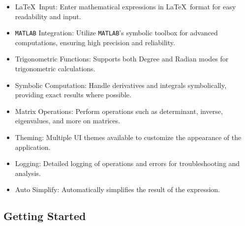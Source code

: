 \documentclass{article}
\begin{document}
\begin{itemize}
\item \LaTeX \, Input: Enter mathematical expressions in
  \LaTeX \, format for easy readability and input.
\item \texttt{MATLAB} Integration: Utilize \texttt{MATLAB}'s symbolic toolbox for
  advanced computations, ensuring high precision and reliability.
\item Trigonometric Functions: Supports both Degree and Radian
  modes for trigonometric calculations.
\item Symbolic Computation: Handle derivatives and integrals
  symbolically, providing exact results where possible.
\item Matrix Operations: Perform operations such as determinant,
  inverse, eigenvalues, and more on matrices.
\item Theming: Multiple UI themes available to customize the
  appearance of the application.
\item Logging: Detailed logging of operations and errors for
  troubleshooting and analysis.
\item Auto Simplify: Automatically simplifies the result of the
  expression.
\end{itemize}

\hfill

\subsection{Getting Started}

\noindent
\end{document}
